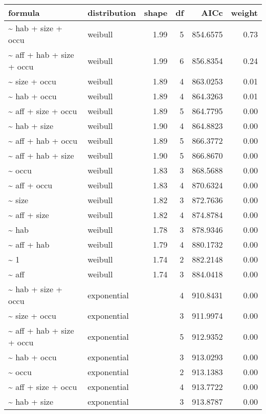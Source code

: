 \begin{table}[ht]
\centering
\begin{tabular}{llrrrr}
 formula & distribution & shape & df & AICc & weight \\ 
  \hline
\~{} hab + size + occu & weibull & 1.99 & 5 & 854.6575 & 0.73 \\ 
  \~{} aff + hab + size + occu & weibull & 1.99 & 6 & 856.8354 & 0.24 \\ 
  \~{} size + occu & weibull & 1.89 & 4 & 863.0253 & 0.01 \\ 
  \~{} hab + occu & weibull & 1.89 & 4 & 864.3263 & 0.01 \\ 
  \~{} aff + size + occu & weibull & 1.89 & 5 & 864.7795 & 0.00 \\ 
  \~{} hab + size & weibull & 1.90 & 4 & 864.8823 & 0.00 \\ 
  \~{} aff + hab + occu & weibull & 1.89 & 5 & 866.3772 & 0.00 \\ 
  \~{} aff + hab + size & weibull & 1.90 & 5 & 866.8670 & 0.00 \\ 
  \~{} occu & weibull & 1.83 & 3 & 868.5688 & 0.00 \\ 
  \~{} aff + occu & weibull & 1.83 & 4 & 870.6324 & 0.00 \\ 
  \~{} size & weibull & 1.82 & 3 & 872.7636 & 0.00 \\ 
  \~{} aff + size & weibull & 1.82 & 4 & 874.8784 & 0.00 \\ 
  \~{} hab & weibull & 1.78 & 3 & 878.9346 & 0.00 \\ 
  \~{} aff + hab & weibull & 1.79 & 4 & 880.1732 & 0.00 \\ 
  \~{} 1 & weibull & 1.74 & 2 & 882.2148 & 0.00 \\ 
  \~{} aff & weibull & 1.74 & 3 & 884.0418 & 0.00 \\ 
  \~{} hab + size + occu & exponential &  & 4 & 910.8431 & 0.00 \\ 
  \~{} size + occu & exponential &  & 3 & 911.9974 & 0.00 \\ 
  \~{} aff + hab + size + occu & exponential &  & 5 & 912.9352 & 0.00 \\ 
  \~{} hab + occu & exponential &  & 3 & 913.0293 & 0.00 \\ 
  \~{} occu & exponential &  & 2 & 913.1383 & 0.00 \\ 
  \~{} aff + size + occu & exponential &  & 4 & 913.7722 & 0.00 \\ 
  \~{} hab + size & exponential &  & 3 & 913.8787 & 0.00 \\ 

\end{tabular}
\end{table}
